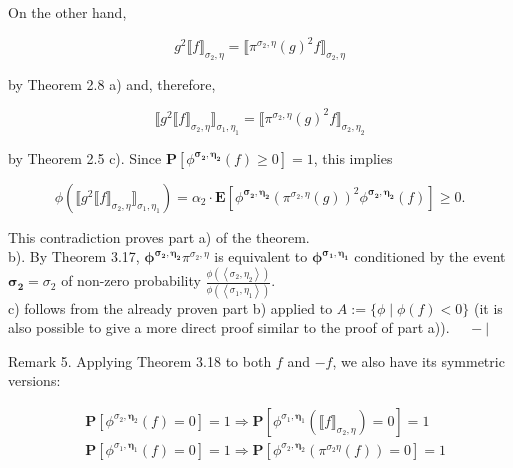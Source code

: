 \documentclass[10pt]{article}
\begin{document}
On the other hand,

$$
g^{2} \llbracket f \rrbracket_{\sigma_{2}, \eta}=\llbracket \pi^{\sigma_{2}, \eta}(g)^{2} f \rrbracket_{\sigma_{2}, \eta}
$$

by Theorem 2.8 a) and, therefore,


\begin{equation*}
\llbracket g^{2} \llbracket f \rrbracket_{\sigma_{2}, \eta} \rrbracket_{\sigma_{1}, \eta_{1}}=\llbracket \pi^{\sigma_{2}, \eta}(g)^{2} f \rrbracket_{\sigma_{2}, \eta_{2}} \tag{25}
\end{equation*}


by Theorem 2.5 c). Since $\mathbf{P}\left[\phi^{\boldsymbol{\sigma}_{\mathbf{2}}, \boldsymbol{\eta}_{\mathbf{2}}}(f) \geq 0\right]=1$, this implies

$$
\phi\left(\llbracket g^{2} \llbracket f \rrbracket_{\sigma_{2}, \eta} \rrbracket_{\sigma_{1}, \eta_{1}}\right)=\alpha_{2} \cdot \mathbf{E}\left[\phi^{\boldsymbol{\sigma}_{\mathbf{2}}, \boldsymbol{\eta}_{\mathbf{2}}}\left(\pi^{\sigma_{2}, \eta}(g)\right)^{2} \phi^{\boldsymbol{\sigma}_{\mathbf{2}}, \boldsymbol{\eta}_{\mathbf{2}}}(f)\right] \geq 0 .
$$

This contradiction proves part a) of the theorem.\\
b). By Theorem 3.17, $\boldsymbol{\phi}^{\boldsymbol{\sigma}_{\mathbf{2}}, \boldsymbol{\eta}_{\mathbf{2}}} \pi^{\sigma_{2}, \eta}$ is equivalent to $\boldsymbol{\phi}^{\boldsymbol{\sigma}_{\mathbf{1}}, \boldsymbol{\eta}_{\mathbf{1}}}$ conditioned by the event $\boldsymbol{\sigma}_{\mathbf{2}}=\sigma_{2}$ of non-zero probability $\frac{\phi\left(\left\langle\sigma_{2}, \eta_{2}\right\rangle\right)}{\phi\left(\left\langle\sigma_{1}, \eta_{1}\right\rangle\right)}$.\\
c) follows from the already proven part b) applied to $A:=\{\phi \mid \phi(f)<0\}$ (it is also possible to give a more direct proof similar to the proof of part a)). $\quad-\mid$

Remark 5. Applying Theorem 3.18 to both $f$ and $-f$, we also have its symmetric versions:


\begin{align*}
& \mathbf{P}\left[\phi^{\sigma_{2}, \boldsymbol{\eta}_{2}}(f)=0\right]=1 \Longrightarrow \mathbf{P}\left[\phi^{\sigma_{1}, \boldsymbol{\eta}_{1}}\left(\llbracket f \rrbracket_{\sigma_{2}, \eta}\right)=0\right]=1 \\
& \mathbf{P}\left[\phi^{\sigma_{1}, \boldsymbol{\eta}_{1}}(f)=0\right]=1 \Longrightarrow \mathbf{P}\left[\phi^{\sigma_{2}, \boldsymbol{\eta}_{2}}\left(\pi^{\sigma_{2} \eta}(f)\right)=0\right]=1 \tag{26}
\end{align*}
\end{document}
